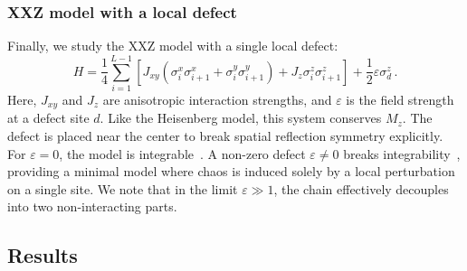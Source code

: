 \documentclass[pra,twocolumn,aps,showpacs,superscriptaddress,longbibliography]{revtex4-2}%
\newcommand{\choip}{\langle \text{Tr}[\mathcal{D}(t)^2] \rangle_{\mathrm{Haar}, T}} %
\newcommand{\statep}{\overline{\mathcal{P}}}
\providecommand{\DIFdelbegin}{} %
\begin{document}
\subsubsection{XXZ model with a local defect}\label{sec:xxz}
Finally, we study the XXZ model with a single local defect:
\begin{equation}\label{eq:H:xxz}
H = \frac{1}{4}\sum_{i=1}^{L-1} \left[ J_{xy} (\sigma_i^x\sigma_{i+1}^x + \sigma_i^y\sigma_{i+1}^y) + J_z \sigma_i^z\sigma_{i+1}^z \right] + \frac{1}{2}\varepsilon \sigma_d^z \, .
\end{equation}
Here, $J_{xy}$ and $J_z$ are anisotropic interaction strengths, and $\varepsilon$ is the field strength at a defect site $d$. Like the Heisenberg model, this system conserves $M_z$. The defect is placed near the center to break spatial reflection symmetry explicitly. For $\varepsilon = 0$, the model is integrable~\cite{bethe_1931_zur}. A non-zero defect $\varepsilon \neq 0$ breaks integrability~\cite{santos_2004_integrability,brenes_2018_hightemperature,pandey_2020_adiabatic}, providing a minimal model where chaos is induced solely by a local perturbation on a single site. We note that in the limit $\varepsilon \gg 1$, the chain effectively decouples into two non-interacting parts.


\subsection{Results}\label{sec:results_discussion}
\DIFdelbegin %

\end{document}
